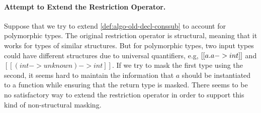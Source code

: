 \paragraph{Attempt to Extend the Restriction Operator.}
Suppose that we try to extend \cref{def:algo-old-decl-conssub} to account for polymorphic
types. The original restriction operator is structural, meaning that it works
for types of similar structures. But for polymorphic types, two input types
could have different structures due to universal quantifiers, e.g, $[[ \/a. a -> int  ]]$
and $[[ (int -> unknown) -> int ]]$. If we try to mask the first type
using the second, it seems hard to maintain the information that $a$ should be
instantiated to a function while ensuring that the return type is masked. There
seems to be no satisfactory way to extend the restriction operator in order to
support this kind of non-structural masking.

